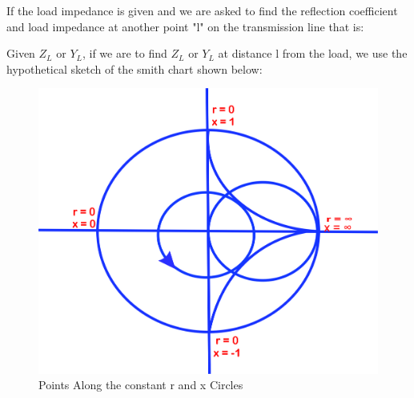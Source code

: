  If the load impedance is given and we are asked to find the reflection coefficient and load impedance at another point "l" on the transmission line that is:

 Given $Z_L$ or $Y_L$, if we are to find $Z_L$ or $Y_L$ at distance l from the load, we use the hypothetical sketch of the smith chart shown below:\\
\begin{figure}[h]
\centering
\includegraphics[width=0.5\linewidth]{./graphics/uytrewsxcvbj}
\caption{Points Along the constant r and x Circles}
\label{fig:uytrewsxcvbj}
\end{figure}

